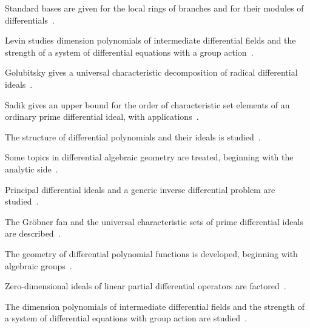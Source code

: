 Standard bases are given for the local rings of branches and for their modules of differentials~\cite{WlStandardBasesForLocalRingsOfBr2020}.

Levin studies dimension polynomials of intermediate differential fields and the strength of a system of differential equations with a group action~\cite{WlDimensionPolynomialsOfIntermed2020}.

Golubitsky gives a universal characteristic decomposition of radical differential ideals~\cite{WlUniversalCharacteristicDecompo2020}.

Sadik gives an upper bound for the order of characteristic set elements of an ordinary prime differential ideal, with applications~\cite{WlABoundForTheOrderOfCharacteris2020}.

The structure of differential polynomials and their ideals is studied~\cite{WlOnTheStructureOfDifferentialPo2020}.

Some topics in differential algebraic geometry are treated, beginning with the analytic side~\cite{WlSomeTopicsInDifferentialAlgebr2020}.

Principal differential ideals and a generic inverse differential problem are studied~\cite{WlPrincipalDifferentialIdealsAnd2020}.

The Gr\"obner fan and the universal characteristic sets of prime differential ideals are described~\cite{WlGrBnerFanAndUniversalCharacter2020}.

The geometry of differential polynomial functions is developed, beginning with algebraic groups~\cite{WlGeometryOfDifferentialPolynomi2020}.

Zero-dimensional ideals of linear partial differential operators are factored~\cite{WlFactoringZeroDimensionalIdeals2020}.

The dimension polynomials of intermediate differential fields and the strength of a system of differential equations with group action are studied~\cite{WlDimensionPolynomialsOfIntermed2020}.
